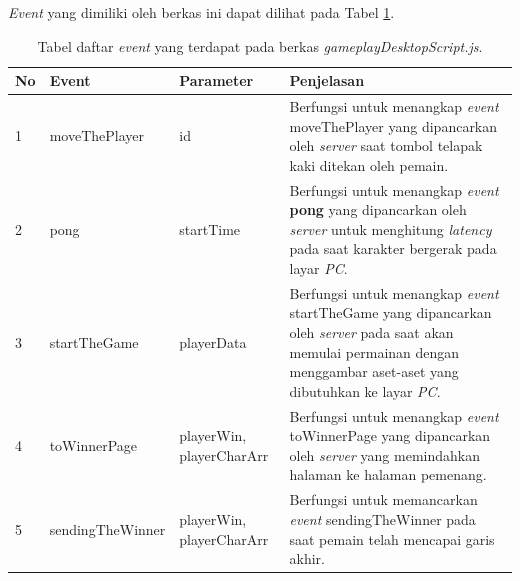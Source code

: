 \begin{enumerate}
\begin{enumerate}
\begin{enumerate}
			\textit{Event} yang dimiliki oleh berkas ini dapat dilihat pada Tabel \ref{table:event_gameplayDesktopScript}.
			\begin{table}[H]
				\centering
				\caption{Tabel daftar \textit{event} yang terdapat pada berkas \textit{gameplayDesktopScript.js}.}
				\begin{tabular}{|p{0.35cm}|p{3cm}|p{3cm}|p{7cm}|}
					\hline
					No & Event & Parameter & Penjelasan \\ \hline
					1 & moveThePlayer & id & Berfungsi untuk menangkap \textit{event} moveThePlayer yang dipancarkan oleh \textit{server} saat tombol telapak kaki ditekan oleh pemain. \\ \hline
					2 & pong & startTime & Berfungsi untuk menangkap \textit{event} \textbf{pong} yang dipancarkan oleh \textit{server} untuk menghitung \textit{latency} pada saat karakter bergerak pada layar \textit{PC}. \\ \hline
					3 & startTheGame & playerData & Berfungsi untuk menangkap \textit{event} startTheGame yang dipancarkan oleh \textit{server} pada saat akan memulai permainan dengan menggambar aset-aset yang dibutuhkan ke layar \textit{PC}. \\ \hline
					4 & toWinnerPage & playerWin, playerCharArr & Berfungsi untuk menangkap \textit{event} toWinnerPage yang dipancarkan oleh \textit{server} yang memindahkan halaman ke halaman pemenang. \\ \hline
					5 & sendingTheWinner & playerWin, playerCharArr & Berfungsi untuk memancarkan \textit{event} sendingTheWinner pada saat pemain telah mencapai garis akhir. \\ \hline
				\end{tabular}
				\label{table:event_gameplayDesktopScript}
			\end{table}
%				
%				

\end{enumerate}
\end{enumerate}
\end{enumerate}

